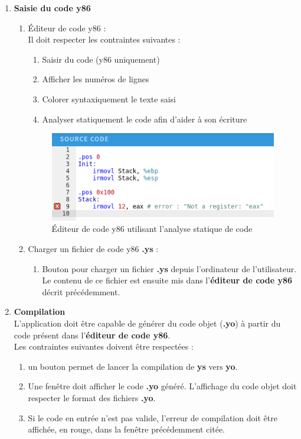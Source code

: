 \documentclass[french]{article}
\begin{document}
\begin{enumerate}
    \item \textbf{Saisie du code y86}
    \begin{enumerate}
        \item Éditeur de code y86 :\\
            Il doit respecter les contraintes suivantes :
        \begin{enumerate}
            \item Saisir du code (y86 uniquement)
            \item Afficher les numéros de lignes
            \item Colorer syntaxiquement le texte saisi
            \item Analyser statiquement le code afin d'aider à son écriture
        \end{enumerate}{}
        \begin{figure}[H]
            \centering
            \includegraphics{img/ex_ys_erreur.png}
            \caption{Éditeur de code y86 utilisant l'analyse statique de code}
            \label{fig:ex_ys_erreur}
        \end{figure}
        
        \item Charger un fichier de code y86 \textbf{.ys} :
        \begin{enumerate}
            \item Bouton pour charger un fichier \textbf{.ys} depuis l'ordinateur de l'utilisateur. Le contenu de ce fichier est ensuite mis dans l'\textbf{éditeur de code y86} décrit précédemment.
        \end{enumerate}{}
    \end{enumerate}{}
    
    
    \item \textbf{Compilation} \\
    L'application doit être capable de générer du code objet (\textbf{.yo}) à partir du code présent dans l'\textbf{éditeur de code y86}.\\
    Les contraintes suivantes doivent être respectées :
    \begin{enumerate}
        \item un bouton permet de lancer la compilation de \textbf{ys} vers \textbf{yo}.
        \item Une fenêtre doit afficher le code \textbf{.yo} généré. L'affichage du code objet doit respecter le format des fichiers \textbf{.yo}.
        \item Si le code en entrée n'est pas valide, l'erreur de compilation doit être affichée, en rouge, dans la fenêtre précédemment citée.
    \end{enumerate}{}
    

\end{enumerate}
\end{document}
